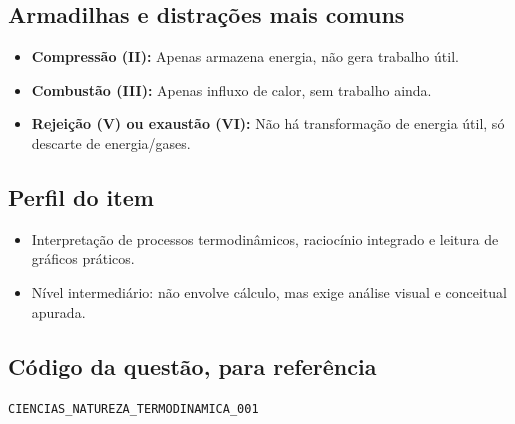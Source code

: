 \documentclass{article}
\begin{document}
\subsection*{Armadilhas e distrações mais comuns}
\begin{itemize}
    \item \textbf{Compressão (II):} Apenas armazena energia, não gera trabalho útil.
    \item \textbf{Combustão (III):} Apenas influxo de calor, sem trabalho ainda.
    \item \textbf{Rejeição (V) ou exaustão (VI):} Não há transformação de energia útil, só descarte de energia/gases.
\end{itemize}

\subsection*{Perfil do item}
\begin{itemize}
    \item Interpretação de processos termodinâmicos, raciocínio integrado e leitura de gráficos práticos.
    \item Nível intermediário: não envolve cálculo, mas exige análise visual e conceitual apurada.
\end{itemize}

\subsection*{Código da questão, para referência}
\noindent\texttt{CIENCIAS\_NATUREZA\_TERMODINAMICA\_001}
\end{document}
